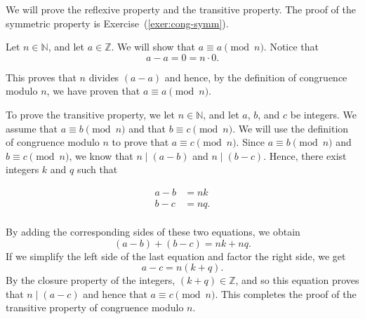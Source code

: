 \begin{myproof}
We will prove the reflexive property and the transitive property.  The proof of the symmetric property is Exercise~(\ref{exer:cong-symm}).

Let  $n \in \mathbb{N}$, and let  $a \in \mathbb{Z}$.  We will show that  
$a \equiv a \pmod n$.  Notice that
\[
a - a = 0 = n \cdot 0.
\]

This proves that  $n$  divides  $\left( {a - a} \right)$ and hence, by the definition of congruence modulo $n$, we have proven that  $a \equiv a \pmod n$.

To prove the transitive property, we let  $n \in \mathbb{N}$, and let  $a$, $b$, and  $c$  be integers.  We assume that  $a \equiv b \pmod n$ and that  $b \equiv c \pmod n$.  We will use the definition of congruence modulo  $n$  to prove that  $a \equiv c \pmod n$.  Since  
$a \equiv b \pmod n$ and  $b \equiv c \pmod n$, we know that $ n \mid \left( a-b \right)$ and  $ n \mid \left( b-c \right)$.  Hence, there exist integers  $k$ and  $q$ such that

\[
\begin{aligned}
a-b &= nk \\
b-c &= nq. \\
\end{aligned}
\]

\noindent
By adding the corresponding sides of these two equations, we obtain
\[
\left( {a - b} \right) + \left( {b - c} \right) = nk + nq.
\]
If we simplify the left side of the last equation and factor the right side, we get
\[
a - c = n\left( {k + q} \right).
\]
By the closure property of the integers,  $\left( {k + q} \right) \in \mathbb{Z}$, and so this equation proves that  $ n \mid \left(a-c \right)$ and hence that  
$a \equiv c \pmod n$.  This completes the proof of the transitive property of congruence modulo $n$.
\end{myproof}
%
\hbreak




\endinput
